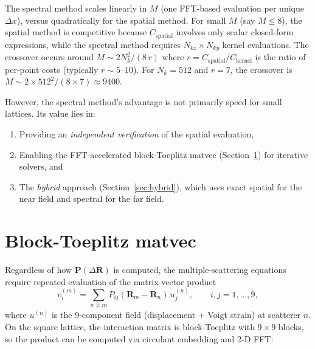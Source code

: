 \documentclass[11pt,a4paper]{article}
\newcommand{\bP}{\mathbf{P}}
\newcommand{\bR}{\mathbf{R}}
\begin{document}
The spectral method scales linearly in $M$ (one FFT-based
evaluation per unique $\Delta x$), versus quadratically for
the spatial method.
For small $M$ (say $M \le 8$), the spatial method is
competitive because $C_{\text{spatial}}$ involves only
scalar closed-form expressions, while the spectral method
requires $N_{kz}\times N_{ky}$ kernel evaluations.
The crossover occurs around $M \sim 2 N_k^2 / (8\,r)$
where $r = C_{\text{spatial}}/C_{\text{kernel}}$ is the
ratio of per-point costs (typically $r \sim 5$--$10$).
For $N_k = 512$ and $r = 7$, the crossover is
$M \sim 2\times 512^2/(8\times 7) \approx 9400$.

However, the spectral method's advantage is not primarily
speed for small lattices.  Its value lies in:
\begin{enumerate}
\item Providing an \emph{independent verification}
  of the spatial evaluation,
\item Enabling the FFT-accelerated block-Toeplitz matvec
  (Section~\ref{sec:matvec}) for iterative solvers, and
\item The \emph{hybrid} approach (Section~\ref{sec:hybrid}),
  which uses exact spatial for the near field and spectral
  for the far field.
\end{enumerate}


\section{Block-Toeplitz matvec}\label{sec:matvec}

Regardless of how $\bP(\Delta\bR)$ is computed, the
multiple-scattering equations require repeated evaluation of
the matrix-vector product
\begin{equation}\label{eq:matvec}
  v_i^{(m)} = \sum_{n\ne m} P_{ij}(\bR_m - \bR_n)\,u_j^{(n)},
  \qquad i,j = 1,\dots,9,
\end{equation}
where $u^{(n)}$ is the 9-component field (displacement +
Voigt strain) at scatterer $n$.
On the square lattice, the interaction matrix is
block-Toeplitz with $9\times 9$ blocks, so the product
can be computed via circulant embedding and 2-D FFT:
\end{document}
